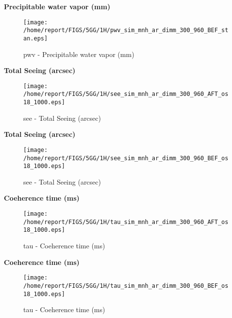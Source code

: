 \documentclass[11pt,english]{article}
\begin{document}
\begin{center}
\textbf{Precipitable water vapor (mm)}
\end{center}

\begin{figure}[htbp]
\centering
{\texttt{[image: /home/report/FIGS/5GG/1H/pwv\_sim\_mnh\_ar\_dimm\_300\_960\_BEF\_stan.eps]}}
\caption{pwv - Precipitable water vapor (mm)}\label{fig:pwv2}
\end{figure}
\newpage

\begin{center}
\textbf{Total Seeing (arcsec)}
\end{center}

\begin{figure}[htbp]
\centering
{\texttt{[image: /home/report/FIGS/5GG/1H/see\_sim\_mnh\_ar\_dimm\_300\_960\_AFT\_os18\_1000.eps]}}
\caption{see - Total Seeing (arcsec)}\label{fig:see1}
\end{figure}
\newpage

\begin{center}
\textbf{Total Seeing (arcsec)}
\end{center}

\begin{figure}[htbp]
\centering
{\texttt{[image: /home/report/FIGS/5GG/1H/see\_sim\_mnh\_ar\_dimm\_300\_960\_BEF\_os18\_1000.eps]}}
\caption{see - Total Seeing (arcsec)}\label{fig:see2}
\end{figure}
\newpage

\begin{center}
\textbf{Coeherence time (ms)}
\end{center}

\begin{figure}[htbp]
\centering
{\texttt{[image: /home/report/FIGS/5GG/1H/tau\_sim\_mnh\_ar\_dimm\_300\_960\_AFT\_os18\_1000.eps]}}
\caption{tau - Coeherence time (ms)}\label{fig:tau1}
\end{figure}
\newpage

\begin{center}
\textbf{Coeherence time (ms)}
\end{center}

\begin{figure}[htbp]
\centering
{\texttt{[image: /home/report/FIGS/5GG/1H/tau\_sim\_mnh\_ar\_dimm\_300\_960\_BEF\_os18\_1000.eps]}}
\caption{tau - Coeherence time (ms)}\label{fig:tau2}
\end{figure}
\newpage
\end{document}
